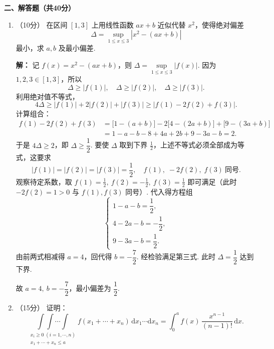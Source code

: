 \textbf{二、解答题（共40分）}
\begin{enumerate}

\item[1.]（10分）
在区间 $[1,3]$ 上用线性函数 $ax+b$ 近似代替 $x^2$，使得绝对偏差
\[
\Delta = \sup_{1\leq x\leq 3}|x^2-(ax+b)|
\]
最小，求 $a,b$ 及最小偏差.

\textbf{解：}
记 $f(x) = x^2 - (ax+b)$，则 $\Delta = \sup\limits_{1\le x\le 3}|f(x)|$.
因为 $1,2,3\in[1,3]$，所以
\[
\Delta \ge |f(1)|,\quad \Delta \ge |f(2)|,\quad \Delta \ge |f(3)|.
\]
利用绝对值不等式，
\[
4\Delta \ge |f(1)| + 2|f(2)| + |f(3)| \ge |f(1) - 2f(2) + f(3)|.
\]
计算组合：
\begin{align*}
f(1) - 2f(2) + f(3) 
&= \bigl[1 - (a+b)\bigr] - 2\bigl[4 - (2a+b)\bigr] + \bigl[9 - (3a+b)\bigr] \\
&= 1 - a - b - 8 + 4a + 2b + 9 - 3a - b = 2.
\end{align*}
于是 $\displaystyle 4\Delta \ge 2$，即 $\Delta \ge \dfrac{1}{2}$.
要使 $\Delta$ 取到下界 $\displaystyle\frac{1}{2}$，上述不等式必须全部成为等式，这要求
\[
|f(1)| = |f(2)| = |f(3)| = \frac{1}{2},\quad 
f(1),\; -2f(2),\; f(3)\ \text{同号}.
\]
观察待定系数，取 $\displaystyle f(1)=\frac{1}{2},\ f(2)=-\frac{1}{2},\ f(3)=\frac{1}{2}$ 即可满足（此时 $-2f(2)=1>0$ 与 $f(1),f(3)$ 同号）. 代入得方程组
\[
\begin{cases}
1 - a - b = \dfrac{1}{2}, \\
4 - 2a - b = -\dfrac{1}{2}, \\
9 - 3a - b = \dfrac{1}{2}.
\end{cases}
\]
由前两式相减得 $a=4$，回代得 $b=-\dfrac{7}{2}$. 经检验满足第三式.
此时 $\Delta = \dfrac{1}{2}$ 达到下界.

故 $a=4,\ b=-\dfrac{7}{2}$，最小偏差为 $\dfrac{1}{2}$.

\item[2.]（15分）
证明：
\[
\underset{\substack{x_i\ge 0\;(i=1,\cdots,n)\\ 
x_1+\cdots+x_n\le a}}{\int\int\cdots\int} f(x_1+\cdots+x_n)\,\mathrm{d}x_1\cdots \mathrm{d}x_n
= \int_0^a f(x)\,\frac{x^{n-1}}{(n-1)!}\,\mathrm{d}x.
\]


\end{enumerate}
